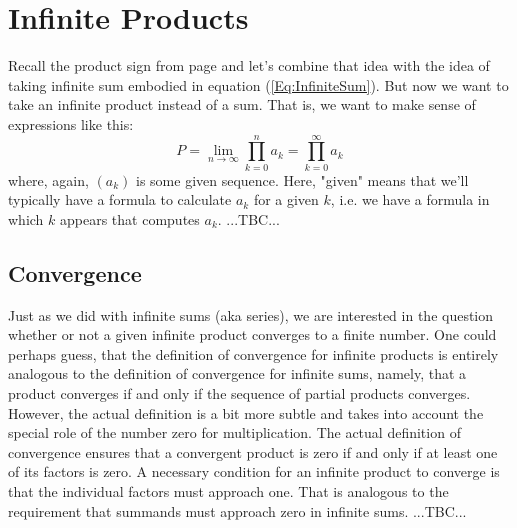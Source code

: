 \section{Infinite Products}
Recall the product sign from page \pageref{Sec:SumsAndProducts} and let's combine that idea with the idea of taking infinite sum embodied in equation (\ref{Eq:InfiniteSum}). But now we want to take an infinite product instead of a sum. That is, we want to make sense of expressions like this:
\begin{equation}
\label{Eq:InfiniteProduct}
P = \lim_{n \rightarrow \infty} \prod_{k=0}^n a_k
  = \prod_{k=0}^{\infty} a_k
\end{equation}
where, again, $(a_k)$ is some given sequence. Here, "given" means that we'll typically have a formula to calculate $a_k$ for a given $k$, i.e. we have a formula in which $k$ appears that computes $a_k$. ...TBC...



\subsection{Convergence}
Just as we did with infinite sums (aka series), we are interested in the question whether or not a given infinite product converges to a finite number. One could perhaps guess, that the definition of convergence for infinite products is entirely analogous to the definition of convergence for infinite sums, namely, that a product converges if and only if the sequence of partial products converges. However, the actual definition is a bit more subtle and takes into account the special role of the number zero for multiplication. The actual definition of convergence ensures that a convergent product is zero if and only if at least one of its factors is zero. A necessary condition for an infinite product to converge is that the individual factors must approach one. That is analogous to the requirement that summands must approach zero in infinite sums.  ...TBC...


